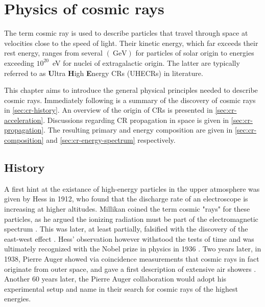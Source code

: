 
\chapter{Physics of cosmic rays}
\label{chap:physical-background}

The term cosmic ray is used to describe particles that travel through space at velocities close to the speed of light. Their kinetic energy, which far exceeds 
their rest energy, ranges from several $(\SI{}{\giga\electronvolt})$ for particles of solar origin to energies exceeding $10^{20}$\SI{}{\electronvolt} for nuclei 
of extragalactic origin. The latter are typically referred to as \textbf{U}ltra \textbf{H}igh \textbf{E}nergy CRs (UHECRs) in literature.

This chapter aims to introduce the general physical principles needed to describe cosmic rays. Immediately following is a summary of the discovery of cosmic rays 
in \autoref{sec:cr-history}. An overview of the origin of CRs is presented in \autoref{sec:cr-acceleration}. Discussions regarding CR propagation in space is given
in \autoref{sec:cr-propagation}. The resulting primary and energy composition are given in \autoref{sec:cr-composition} and \autoref{sec:cr-energy-spectrum} 
respectively. 

\section{History}
\label{sec:cr-history}

A first hint at the existance of high-energy particles in the upper atmosphere was given by Hess in 1912, who found that the discharge rate of an electroscope is 
increasing at higher altitudes. Millikan coined the term cosmic "rays" for these particles, as he argued the ionizing radiation must be part of the electromagnetic
spectrum \cite{millikan1928origin}. This was later, at least partially, falsified with the discovery of the east-west effect \cite{johnson1938note}. Hess' 
observation however withstood the tests of time and was ultimately recognized with the Nobel prize in physics in 1936 \cite{nobelprize1936}. Two years later, in 
1938, Pierre Auger showed via coincidence measurements that cosmic rays in fact originate from outer space, and gave a first description of extensive air showers 
\cite{auger1939extensive}. Another 60 years later, the Pierre Auger collaboration would adopt his experimental setup and name in their search for cosmic rays of 
the highest energies.

